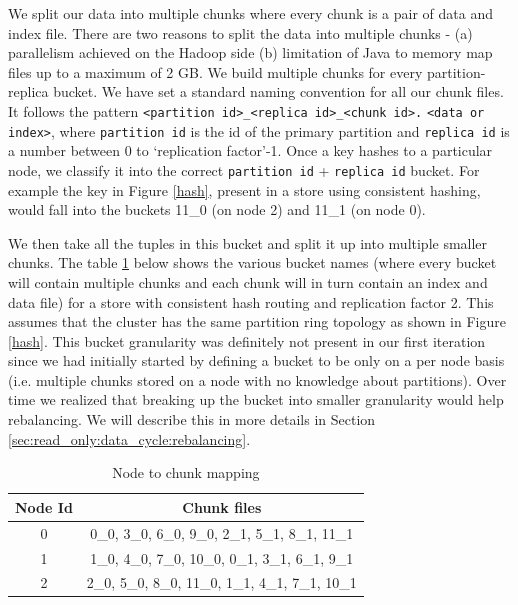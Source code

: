 \documentclass[twocolumn]{article}
\begin{document}
We split our data into multiple chunks where every chunk is a pair of data and index file. There are two reasons to split the data into multiple chunks - (a) parallelism achieved on the Hadoop side (b) limitation of Java to memory map files up to a maximum of 2 GB. We build multiple chunks for every partition-replica bucket. We have set a standard naming convention for all our chunk files. It follows the pattern \verb=<partition id>_<replica id>_<chunk id>.= \verb=<data or index>=, where \verb=partition id= is the id of the primary partition and \verb=replica id= is a number between 0 to `replication factor'-1. Once a key hashes to a particular node, we classify it into the correct \verb=partition id= + \verb=replica id= bucket. For example the key in Figure \ref{hash}, present in a store using consistent hashing, would fall into the buckets 11\_0 (on node 2) and 11\_1 (on node 0). 

We then take all the tuples in this bucket and split it up into multiple smaller chunks. The table \ref{tab:node_to_chunk} below shows the various bucket names (where every bucket will contain multiple chunks and each chunk will in turn contain an index and data file) for a store with consistent hash routing and replication factor 2. This assumes that the cluster has the same partition ring topology as shown in Figure \ref{hash}. This bucket granularity was definitely not present in our first iteration since we had initially started by defining a bucket to be only on a per node basis (i.e. multiple chunks stored on a node with no knowledge about partitions). Over time we realized that breaking up the bucket into smaller granularity would help rebalancing. We will describe this in more details in Section \ref{sec:read_only:data_cycle:rebalancing}. 

\begin{table}
\begin{center}
    \begin{tabular}{ | c | c | }
    \hline
    Node Id & Chunk files \\ \hline
    0 &  0\_0, 3\_0, 6\_0, 9\_0,      2\_1, 5\_1, 8\_1, 11\_1	\\
   1 &   1\_0, 4\_0, 7\_0, 10\_0,      0\_1, 3\_1, 6\_1, 9\_1		\\
   2 &    2\_0, 5\_0, 8\_0, 11\_0,    1\_1, 4\_1, 7\_1, 10\_1		\\
\hline
    \end{tabular}
\end{center}
 	\caption{Node to chunk mapping}
 	\label{tab:node_to_chunk}
\end{table}
\end{document}
